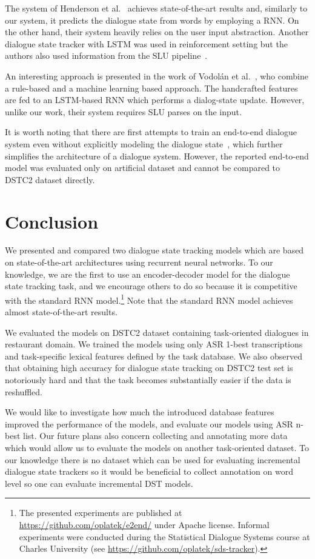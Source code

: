 \documentclass{itatnew}
\begin{document}
The system of Henderson et al.~\cite{henderson2014word} achieves state-of-the-art results and, similarly to our system, it predicts the dialogue state from words by employing a RNN.
On the other hand, their system heavily relies on the user input abstraction.
Another dialogue state tracker with LSTM was used in reinforcement setting but the authors also used information from the SLU pipeline~\cite{lee2016dialog}.

An interesting approach is presented in the work of Vodolán et al.~\cite{vodolan2015hybrid}, who combine a rule-based and a machine learning based approach.
The handcrafted features are fed to an LSTM-based RNN which performs a dialog-state update.
However, unlike our work, their system requires SLU parses on the input.

It is worth noting that there are first attempts to train an end-to-end dialogue system even without explicitly modeling the dialogue state~\cite{bordes2016learning}, which further simplifies the architecture of a dialogue system.
However, the reported end-to-end model was evaluated only on artificial dataset and cannot be compared to DSTC2 dataset directly.

\section{Conclusion}\label{sec:conc}
We presented and compared two dialogue state tracking models which are based on state-of-the-art architectures using recurrent neural networks.
To our knowledge, we are the first to use an encoder-decoder model for the dialogue state tracking task, and we encourage others to do so because it is competitive with the standard RNN model.\footnote{The presented experiments are published at \url{https://github.com/oplatek/e2end/} under Apache license. Informal experiments were conducted during the Statistical Dialogue Systems course at Charles University (see \url{https://github.com/oplatek/sds-tracker}).}
Note that the standard RNN model achieves almost state-of-the-art results.

We evaluated the models on DSTC2 dataset containing task-oriented dialogues in restaurant domain. 
We trained the models using only ASR 1-best transcriptions and task-specific lexical features defined by the task database.
We also observed that obtaining high accuracy for dialogue state tracking on DSTC2 test set is notoriously hard and that the task becomes substantially easier if the data is reshuffled.

We would like to investigate how much the introduced database features improved the performance of the models, and evaluate our models using ASR n-best list.
Our future plans also concern collecting and annotating more data which would allow us to evaluate the models on another task-oriented dataset.
To our knowledge there is no dataset which can be used for evaluating incremental dialogue state trackers so it would be beneficial to collect annotation on word level so one can evaluate incremental DST models.

\newpage


\end{document}
